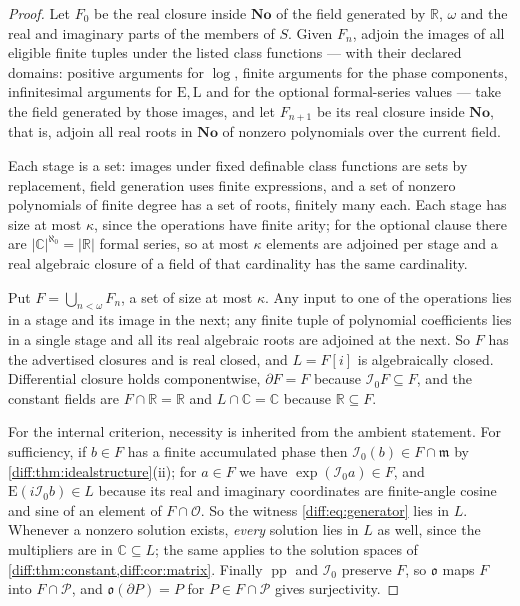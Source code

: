 \documentclass[11pt,letterpaper]{article}
\numberwithin{equation}{section}
\theoremstyle{definition}
\theoremstyle{remark}
\newcommand{\No}{\mathbf{No}}
\newcommand{\R}{\mathbb R}
\newcommand{\C}{\mathbb C}
\newcommand{\der}{\partial}
\newcommand{\Ofin}{\mathcal O}
\newcommand{\mm}{\mathfrak m}
\newcommand{\Pcl}{\mathcal P}
\newcommand{\Izero}{\mathcal I_{0}}
\newcommand{\Obs}{\mathfrak o}
\newcommand{\pp}{\operatorname{pp}}
\newcommand{\Emm}{\mathrm{E}}
\newcommand{\Lmm}{\mathrm{L}}
\newcommand{\abs}[1]{\lvert#1\rvert}
\begin{document}
\begin{proof}
Let $F_{0}$ be the real closure inside $\No$ of the field generated by $\R$,
$\omega$ and the real and imaginary parts of the members of $S$. Given
$F_{n}$, adjoin the images of all eligible finite tuples under the listed class
functions --- with their declared domains: positive arguments for $\log$,
finite arguments for the phase components, infinitesimal arguments for
$\Emm,\Lmm$ and for the optional formal-series values --- take the field
generated by those images, and let $F_{n+1}$ be its real closure inside $\No$,
that is, adjoin all real roots in $\No$ of nonzero polynomials over the
current field.

Each stage is a set: images under fixed definable class functions are sets by
replacement, field generation uses finite expressions, and a set of nonzero
polynomials of finite degree has a set of roots, finitely many each. Each stage
has size at most $\kappa$, since the operations have finite arity; for the
optional clause there are $\abs\C^{\aleph_{0}}=\abs\R$ formal series, so at
most $\kappa$ elements are adjoined per stage and a real algebraic closure of a
field of that cardinality has the same cardinality.

Put $F=\bigcup_{n<\omega}F_{n}$, a set of size at most $\kappa$. Any input to
one of the operations lies in a stage and its image in the next; any finite
tuple of polynomial coefficients lies in a single stage and all its real
algebraic roots are adjoined at the next. So $F$ has the advertised closures
and is real closed, and $L=F[i]$ is algebraically closed. Differential closure
holds componentwise, $\der F=F$ because $\Izero F\subseteq F$, and the constant
fields are $F\cap\R=\R$ and $L\cap\C=\C$ because $\R\subseteq F$.

For the internal criterion, necessity is inherited from the ambient statement.
For sufficiency, if $b\in F$ has a finite accumulated phase then
$\Izero(b)\in F\cap\mm$ by \cref{diff:thm:idealstructure}(ii); for $a\in F$ we
have $\exp(\Izero a)\in F$, and $\Emm(i\Izero b)\in L$ because its real and
imaginary coordinates are finite-angle cosine and sine of an element of
$F\cap\Ofin$. So the witness \cref{diff:eq:generator} lies in $L$. Whenever a
nonzero solution exists, \emph{every} solution lies in $L$ as well, since the
multipliers are in $\C\subseteq L$; the same applies to the solution spaces of
\cref{diff:thm:constant,diff:cor:matrix}. Finally $\pp$ and $\Izero$ preserve
$F$, so $\Obs$ maps $F$ into $F\cap\Pcl$, and
$\Obs(\der P)=P$ for $P\in F\cap\Pcl$ gives surjectivity.
\end{proof}
\end{document}
